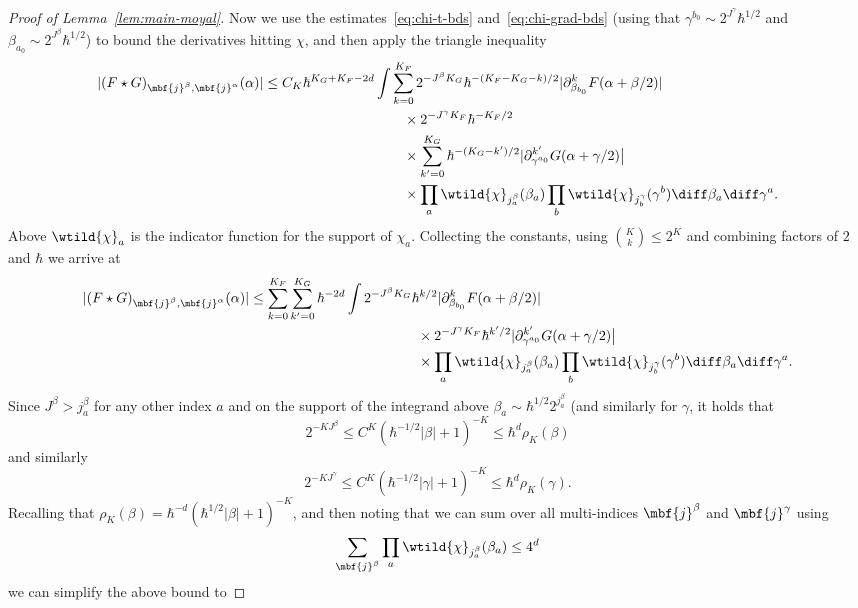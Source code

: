 \documentclass{article}
\numberwithin{equation}{section}
\begin{document}
\begin{proof}[Proof of Lemma~\ref{lem:main-moyal}]
	Now we use the estimates~\eqref{eq:chi-t-bds} and~\eqref{eq:chi-grad-bds}
	(using that $\gamma^{b_0} \sim 2^{J^\gamma}\hbar^{1/2}$ and $\beta_{a_0}\sim 2^{J^\beta}\hbar^{1/2}$) to
	bound the derivatives hitting $\chi$, and then apply the triangle inequality
	\begin{equation}
		\begin{split}
			|(F\star G)_{\mbf{j}^\beta,\mbf{j}^\alpha}(\alpha)| &\leq C_K
			\hbar^{K_G+K_F-2d}
			\int \sum_{k=0}^{K_F}
			2^{-J^\beta K_G}
			\hbar^{-(K_F-K_G-k)/2}
			|\partial_{\beta_{b_0}}^{k} F(\alpha+\beta/2)| \\
			& \qquad\qquad\qquad\qquad\qquad\times
			2^{-J^\gamma K_F}\hbar^{-K_F/2}
			\\
			& \qquad\qquad\qquad\qquad\qquad\times
			\sum_{k'=0}^{K_G}
			\hbar^{-(K_G-k')/2}
			|\partial_{\gamma^{a_0}}^{k'}G(\alpha+\gamma/2)\big| \\
			&\qquad\qquad\qquad\qquad\qquad\times
			\prod_{a} \wtild{\chi}_{j^\beta_a}(\beta_a)
			\prod_{b} \wtild{\chi}_{j^\gamma_b}(\gamma^b)
			\diff \beta_a\diff\gamma^a.
		\end{split}
	\end{equation}
	Above $\wtild{\chi}_a$ is the indicator
	function for the support of $\chi_a$.
	Collecting the constants, using
	$\binom{K}{k}\leq 2^K$ and combining factors
	of $2$ and $\hbar$ we arrive at
	\begin{equation}
		\begin{split}
			|(F\star G)_{\mbf{j}^\beta,\mbf{j}^\alpha}(\alpha)| &\leq
			\sum_{k=0}^{K_F} \sum_{k'=0}^{K_G}
			\hbar^{-2d}
			\int
			2^{-J^\beta K_G}
			\hbar^{k/2}
			|\partial_{\beta_{b_0}}^{k} F(\alpha+\beta/2)| \\
			& \qquad\qquad\qquad\qquad\qquad\qquad\times
			2^{-J^\gamma K_F}
			\hbar^{k'/2}
			|\partial_{\gamma^{a_0}}^{k'}G(\alpha+\gamma/2)\big| \\
			&\qquad\qquad\qquad\qquad\qquad\qquad\times
			\prod_{a} \wtild{\chi}_{j^\beta_a}(\beta_a)
			\prod_{b} \wtild{\chi}_{j^\gamma_b}(\gamma^b)
			\diff \beta_a\diff\gamma^a.
		\end{split}
	\end{equation}
	Since $J^\beta > j^\beta_a$ for any other index $a$ and on the support of the integrand above $\beta_a \sim \hbar^{1/2} 2^{j^\beta_a}$
	(and similarly for $\gamma$, it holds that
	\[
	2^{-KJ^\beta}
	\leq C^K (\hbar^{-1/2}|\beta|+1)^{-K}
	\leq \hbar^d \rho_K(\beta)
	\]
	and similarly
	\[
	2^{-KJ^\gamma}
	\leq C^K (\hbar^{-1/2}|\gamma|+1)^{-K}
	\leq \hbar^d \rho_K(\gamma).
	\]
	Recalling that $\rho_K(\beta) = \hbar^{-d} (\hbar^{1/2}|\beta| + 1)^{-K}$,
	and then noting that we can sum over all multi-indices $\mbf{j}^\beta$
	and $\mbf{j}^\gamma$ using
	\[
	\sum_{\mbf{j}^\beta}
	\prod_a \wtild{\chi}_{j^\beta_a}(\beta_a) \leq 4^d
	\]
	we can simplify the above bound to
	

\end{proof}
\end{document}
